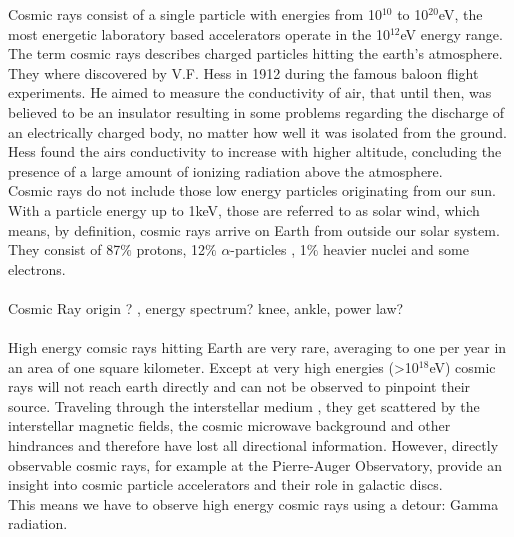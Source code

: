 \documentclass[12pt,article,type=msc,colorback,accentcolor=tud9c]{tudthesis}
\begin{document}
Cosmic rays consist of a single particle with energies from 10$^{10}$ to 10$^{20}$eV, the most energetic laboratory based accelerators operate in the 10$^{12}$eV energy range. The term cosmic rays describes charged particles hitting the earth's atmosphere. They where discovered by V.F. Hess in 1912 during the famous baloon flight experiments. He aimed to measure the conductivity of air, that until then, was believed to be an insulator resulting in some problems regarding the discharge of an electrically charged body, no matter how well it was isolated from the ground. Hess found the airs conductivity to increase with higher altitude, concluding the presence of a large amount of ionizing radiation above the atmosphere.\\
Cosmic rays do not include those low energy particles originating from our sun. With a particle energy up to 1keV, those are referred to as solar wind, which means, by definition, cosmic rays arrive on Earth from outside our solar system. They consist of 87$\%$ protons, 12$\%$ $\alpha$-particles , 1$\%$ heavier nuclei and some electrons. \\\\
Cosmic Ray origin ? , energy spectrum? knee, ankle, power law?\\\\

High energy comsic rays hitting Earth are very rare, averaging to one per year in an area of one square kilometer.
Except at very high energies (>10$^{18}$eV) cosmic rays will not reach earth directly and can not be observed to pinpoint their source. Traveling through the interstellar medium , they get scattered by the interstellar magnetic fields, the cosmic microwave background and other hindrances and therefore have lost all directional information. However, directly observable cosmic rays, for example at the Pierre-Auger Observatory, provide an insight into cosmic particle accelerators and their role in galactic discs.\cite{CTADesign}\\

This means we have to observe high energy cosmic rays using a detour: Gamma radiation. \\



\end{document}
